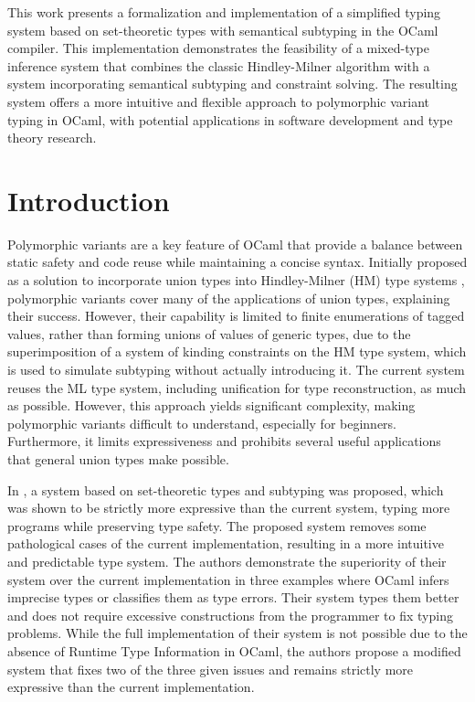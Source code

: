 \documentclass[a4paper,11pt,oneside]{article}
\theoremstyle{definition}
\begin{document}
This work presents a formalization and implementation of a simplified
typing system based on set-theoretic types with semantical subtyping in
the OCaml compiler. This implementation demonstrates the feasibility of
a mixed-type inference system that combines the classic Hindley-Milner
algorithm with a system incorporating semantical subtyping and constraint
solving. The resulting system offers a more intuitive and flexible approach
to polymorphic variant typing in OCaml, with potential applications in
software development and type theory research.

\newpage
\tableofcontents

\clearpage
{}

\section{Introduction}

Polymorphic variants are a key feature of OCaml that provide a balance
between static safety and code reuse while maintaining a concise syntax.
Initially proposed as a solution to incorporate union types into
Hindley-Milner (HM) type systems \cite{Garrigue_1998}, polymorphic
variants cover many of the applications of union types, explaining
their success. However, their capability is limited to finite enumerations
of tagged values, rather than forming unions of values of generic types,
due to the superimposition of a system of kinding constraints on the HM
type system, which is used to simulate subtyping without actually
introducing it. The current system reuses the ML type system, including
unification for type reconstruction, as much as possible. However, this
approach yields significant complexity, making polymorphic variants difficult
to understand, especially for beginners. Furthermore, it limits expressiveness
and prohibits several useful applications that general union types make possible.

In \cite{Castagna_2016}, a system based on set-theoretic types and subtyping was
proposed, which was shown to be strictly more expressive than the current system,
typing more programs while preserving type safety. The proposed system removes
some pathological cases of the current implementation, resulting in a more
intuitive and predictable type system. The authors demonstrate the superiority
of their system over the current implementation in three examples where OCaml
infers imprecise types or classifies them as type errors. Their system types
them better and does not require excessive constructions from the programmer
to fix typing problems. While the full implementation of their system is not
possible due to the absence of Runtime Type Information in OCaml, the authors
propose a modified system that fixes two of the three given issues and remains
strictly more expressive than the current implementation.
\end{document}
